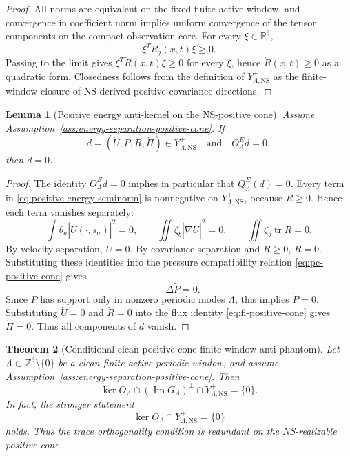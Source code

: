 \documentclass[11pt]{article}
\numberwithin{equation}{section}
\newtheorem{theorem}{Theorem}[section]
\newtheorem{lemma}[theorem]{Lemma}
\newcommand{\R}{\mathbb R}
\newcommand{\Z}{\mathbb Z}
\newcommand{\NS}{\mathrm{NS}}
\newcommand{\Image}{\operatorname{Im}}
\begin{document}
\begin{proof}
All norms are equivalent on the fixed finite active window, and convergence in coefficient norm implies uniform convergence of the tensor components on the compact observation core.  For every \(\xi\in\R^3\),
\[
    \xi^T\dot R_j(x,t)\xi\ge0.
\]
Passing to the limit gives \(\xi^T\dot R(x,t)\xi\ge0\) for every \(\xi\), hence \(\dot R(x,t)\ge0\) as a quadratic form.  Closedness follows from the definition of \(Y_{\Lambda,\NS}^{+}\) as the finite-window closure of NS-derived positive covariance directions.
\end{proof}

\begin{lemma}[Positive energy anti-kernel on the NS-positive cone]\label{lem:positive-energy-kills-positive-cone}
Assume Assumption~\ref{ass:energy-separation-positive-cone}.  If
\[
    d=(\dot U,\dot P,\dot R,\dot\Pi)
    \in Y_{\Lambda,\NS}^{+}
    \quad\text{and}\quad
    O^E_\Lambda d=0,
\]
then \(d=0\).
\end{lemma}

\begin{proof}
The identity \(O^E_\Lambda d=0\) implies in particular that \(Q^E_\Lambda(d)=0\).  Every term in \eqref{eq:positive-energy-seminorm} is nonnegative on \(Y_{\Lambda,\NS}^{+}\), because \(\dot R\ge0\).  Hence each term vanishes separately:
\[
    \int \theta_a|\dot U(\cdot,s_a)|^2=0,
    \qquad
    \iint \zeta_b|\nabla\dot U|^2=0,
    \qquad
    \iint \zeta_b\operatorname{tr}\dot R=0.
\]
By velocity separation, \(\dot U=0\).  By covariance separation and \(\dot R\ge0\), \(\dot R=0\).  Substituting these identities into the pressure compatibility relation \eqref{eq:pc-positive-cone} gives
\[
    -\Delta\dot P=0.
\]
Since \(\dot P\) has support only in nonzero periodic modes \(\Lambda\), this implies \(\dot P=0\).  Substituting \(\dot U=0\) and \(\dot R=0\) into the flux identity \eqref{eq:fi-positive-cone} gives \(\dot\Pi=0\).  Thus all components of \(d\) vanish.
\end{proof}

\begin{theorem}[Conditional clean positive-cone finite-window anti-phantom]\label{thm:ns-positive-cone-antiphantom}
Let \(\Lambda\subset\Z^3\setminus\{0\}\) be a clean finite active periodic window, and assume Assumption~\ref{ass:energy-separation-positive-cone}.  Then
\begin{equation}\label{eq:ns-positive-cone-antiphantom}
    \ker O_\Lambda
    \cap
    (\Image G_\Lambda)^\perp
    \cap
    Y_{\Lambda,\NS}^{+}
    =
    \{0\}.
\end{equation}
In fact, the stronger statement
\begin{equation}\label{eq:energy-already-kills-positive-cone}
    \ker O_\Lambda\cap Y_{\Lambda,\NS}^{+}=\{0\}
\end{equation}
holds.  Thus the trace orthogonality condition is redundant on the NS-realizable positive cone.
\end{theorem}
\end{document}
